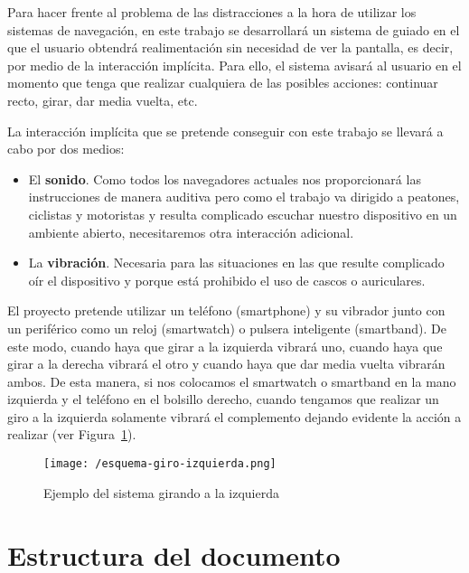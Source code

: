 Para hacer frente al problema de las distracciones a la hora de utilizar los sistemas de navegación,
en este trabajo se desarrollará un sistema de guiado en el que el usuario obtendrá realimentación
sin necesidad de ver la pantalla, es decir, por medio de la interacción implícita. Para ello, el
sistema avisará al usuario en el momento que tenga que realizar cualquiera de las posibles acciones:
continuar recto, girar, dar media vuelta, etc.

La  interacción implícita que  se pretende  conseguir con  este trabajo  se llevará  a cabo  por dos
medios:
\begin{itemize}
  \item El \textbf{sonido}. Como todos los navegadores actuales nos proporcionará las instrucciones
    de manera auditiva pero como el trabajo va dirigido a peatones, ciclistas y motoristas y resulta
    complicado escuchar nuestro dispositivo en un ambiente abierto, necesitaremos otra interacción
    adicional.
  \item La \textbf{vibración}. Necesaria para las situaciones en las que resulte complicado oír el
    dispositivo y porque está prohibido el uso de cascos o auriculares.
\end{itemize}

El proyecto pretende utilizar un teléfono (smartphone) y su vibrador junto con un periférico como un
reloj (smartwatch) o pulsera inteligente (smartband). De este modo, cuando haya que girar a la
izquierda vibrará uno, cuando haya que girar a la derecha vibrará el otro y cuando haya que dar
media vuelta vibrarán ambos. De esta manera, si nos colocamos el smartwatch o smartband en la mano
izquierda y el teléfono en el bolsillo derecho, cuando tengamos que realizar un giro a la izquierda
solamente vibrará el complemento dejando evidente la acción a realizar (ver
Figura~\ref{fig:giroIzquierda}).

\begin{figure}[!h]
  \begin{center}
    \texttt{[image: /esquema-giro-izquierda.png]}
    \caption{Ejemplo del sistema girando a la izquierda}
    \label{fig:giroIzquierda}
  \end{center}
\end{figure}


\section{Estructura del documento}

